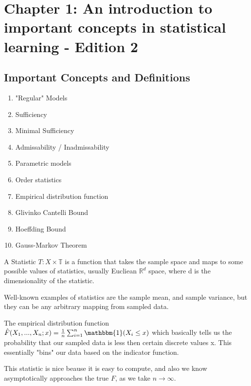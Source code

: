 
\section{Chapter 1: An introduction to important concepts in statistical learning - Edition 2}
  \label{sec:chapterone_v2}
  \subsection{Important Concepts and Definitions}
  	\begin{enumerate}
      \item "Regular" Models
  		\item Sufficiency
  		\item Minimal Sufficiency
      \item Admissability / Inadmissability
      \item Parametric models
      \item Order statistics
      \item Empirical distribution function
      \item Glivinko Cantelli Bound
      \item Hoeffding Bound
      \item Gauss-Markov Theorem
  	\end{enumerate}

    \begin{definition}{A Statistic}
    $T : X \times \mathbb{T}$ is a function that takes the sample space and maps to some possible values of statistics, usually Eucliean $\mathbb{R}^d$ space, where d is the dimensionality of the statistic.
    \end{definition}

    Well-known examples of statistics are the sample mean, and sample variance, but they can be any arbitrary mapping from sampled data.

    \begin{definition}{The empirical distribution function}
    $\hat{F}(X_1, ..., X_n; x) = \frac{1}{n} \sum_{i=1}^n \mathbbm{1}(X_i \le x)$ which basically tells us the probability that our sampled data is less then certain discrete values x. This essentially "bins" our data based on the indicator function.
    \end{definition}

    This statistic is nice beause it is easy to compute, and also we know asymptotically approaches the true $F$, as we take $n \rightarrow \infty$.

